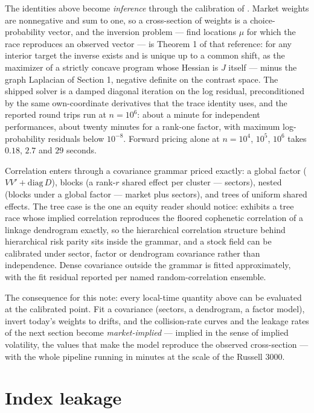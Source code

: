 \documentclass[11pt]{article}
\begin{document}
The identities above become \emph{inference} through the calibration of
\citet{cotton2026}. Market weights are nonnegative and sum to one, so a
cross-section of weights is a choice-probability vector, and the
inversion problem --- find locations $\mu$ for which the race
reproduces an observed vector --- is Theorem 1 of that reference: for
any interior target the inverse exists and is unique up to a common
shift, as the maximizer of a strictly concave program whose Hessian is
$J$ itself --- minus the graph Laplacian of Section 1, negative
definite on the contrast space. The shipped solver is a damped
diagonal iteration on the log residual, preconditioned by the same
own-coordinate derivatives that the trace identity uses, and the
reported round trips run at $n=10^{6}$: about a minute for independent
performances, about twenty minutes for a rank-one factor, with maximum
log-probability residuals below $10^{-8}$. Forward pricing alone at
$n=10^{4}$, $10^{5}$, $10^{6}$ takes $0.18$, $2.7$ and $29$ seconds.

Correlation enters through a covariance grammar priced exactly: a
global factor ($VV'+\mathrm{diag}\,D$), blocks (a rank-$r$ shared
effect per cluster --- sectors), nested (blocks under a global factor
--- market plus sectors), and trees of uniform shared effects. The tree
case is the one an equity reader should notice: \citet{cotton2026}
exhibits a tree race whose implied correlation reproduces the floored
cophenetic correlation of a linkage dendrogram exactly, so the
hierarchical correlation structure behind hierarchical risk parity sits
inside the grammar, and a stock field can be calibrated under sector,
factor or dendrogram covariance rather than independence. Dense
covariance outside the grammar is fitted approximately, with the fit
residual reported per named random-correlation ensemble.

The consequence for this note: every local-time quantity above can be
evaluated at the calibrated point. Fit a covariance (sectors, a
dendrogram, a factor model), invert today's weights to drifts, and the
collision-rate curves and the leakage rates of the next section become
\emph{market-implied} --- implied in the sense of implied volatility,
the values that make the model reproduce the observed cross-section ---
with the whole pipeline running in minutes at the scale of the Russell
3000.

\section{Index leakage}
\end{document}
